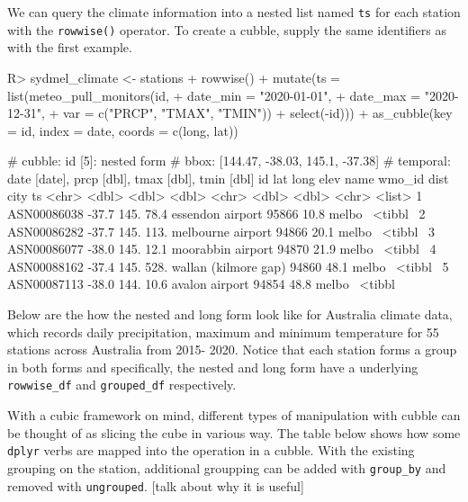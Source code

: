 \documentclass[
]{jss}
\begin{document}
We can query the climate information into a nested list named
\texttt{ts} for each station with the \texttt{rowwise()} operator. To
create a cubble, supply the same identifiers as with the first example.

\begin{CodeChunk}
\begin{CodeInput}
R> sydmel_climate <- stations %
+   rowwise() %
+   mutate(ts = list(meteo_pull_monitors(id,
+                                        date_min = "2020-01-01",
+                                        date_max = "2020-12-31",
+                                        var = c("PRCP", "TMAX", "TMIN")) %
+                      select(-id))) %
+   as_cubble(key = id, index = date, coords = c(long, lat))
\end{CodeInput}
\end{CodeChunk}

\begin{CodeChunk}
\begin{CodeOutput}
# cubble:   id [5]: nested form
# bbox:     [144.47, -38.03, 145.1, -37.38]
# temporal: date [date], prcp [dbl], tmax [dbl], tmin [dbl]
  id            lat  long  elev name                 wmo_id  dist city   ts     
  <chr>       <dbl> <dbl> <dbl> <chr>                 <dbl> <dbl> <chr>  <list> 
1 ASN00086038 -37.7  145.  78.4 essendon airport      95866  10.8 melbo~ <tibbl~
2 ASN00086282 -37.7  145. 113.  melbourne airport     94866  20.1 melbo~ <tibbl~
3 ASN00086077 -38.0  145.  12.1 moorabbin airport     94870  21.9 melbo~ <tibbl~
4 ASN00088162 -37.4  145. 528.  wallan (kilmore gap)  94860  48.1 melbo~ <tibbl~
5 ASN00087113 -38.0  144.  10.6 avalon airport        94854  48.8 melbo~ <tibbl~
\end{CodeOutput}
\end{CodeChunk}

Below are the how the nested and long form look like for Australia
climate data, which records daily precipitation, maximum and minimum
temperature for 55 stations across Australia from 2015- 2020. Notice
that each station forms a group in both forms and specifically, the
nested and long form have a underlying \texttt{rowwise\_df} and
\texttt{grouped\_df} respectively.

With a cubic framework on mind, different types of manipulation with
cubble can be thought of as slicing the cube in various way. The table
below shows how some \texttt{dplyr} verbs are mapped into the operation
in a cubble. With the existing grouping on the station, additional
groupping can be added with \texttt{group\_by} and removed with
\texttt{ungrouped}. {[}talk about why it is useful{]}
\end{document}
